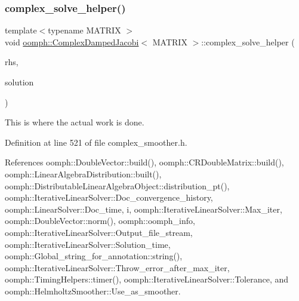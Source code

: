 \subsubsection{\texorpdfstring{complex\+\_\+solve\+\_\+helper()}{complex\_solve\_helper()}}
{\footnotesize\ttfamily template$<$typename M\+A\+T\+R\+IX $>$ \\
void \hyperlink{classoomph_1_1ComplexDampedJacobi}{oomph\+::\+Complex\+Damped\+Jacobi}$<$ M\+A\+T\+R\+IX $>$\+::complex\+\_\+solve\+\_\+helper (\begin{DoxyParamCaption}\item[{const \hyperlink{classoomph_1_1Vector}{Vector}$<$ \hyperlink{classoomph_1_1DoubleVector}{Double\+Vector} $>$ \&}]{rhs,  }\item[{\hyperlink{classoomph_1_1Vector}{Vector}$<$ \hyperlink{classoomph_1_1DoubleVector}{Double\+Vector} $>$ \&}]{solution }\end{DoxyParamCaption})\hspace{0.3cm}{\ttfamily [private]}}



This is where the actual work is done. 



Definition at line 521 of file complex\+\_\+smoother.\+h.



References oomph\+::\+Double\+Vector\+::build(), oomph\+::\+C\+R\+Double\+Matrix\+::build(), oomph\+::\+Linear\+Algebra\+Distribution\+::built(), oomph\+::\+Distributable\+Linear\+Algebra\+Object\+::distribution\+\_\+pt(), oomph\+::\+Iterative\+Linear\+Solver\+::\+Doc\+\_\+convergence\+\_\+history, oomph\+::\+Linear\+Solver\+::\+Doc\+\_\+time, i, oomph\+::\+Iterative\+Linear\+Solver\+::\+Max\+\_\+iter, oomph\+::\+Double\+Vector\+::norm(), oomph\+::oomph\+\_\+info, oomph\+::\+Iterative\+Linear\+Solver\+::\+Output\+\_\+file\+\_\+stream, oomph\+::\+Iterative\+Linear\+Solver\+::\+Solution\+\_\+time, oomph\+::\+Global\+\_\+string\+\_\+for\+\_\+annotation\+::string(), oomph\+::\+Iterative\+Linear\+Solver\+::\+Throw\+\_\+error\+\_\+after\+\_\+max\+\_\+iter, oomph\+::\+Timing\+Helpers\+::timer(), oomph\+::\+Iterative\+Linear\+Solver\+::\+Tolerance, and oomph\+::\+Helmholtz\+Smoother\+::\+Use\+\_\+as\+\_\+smoother.

\mbox{\label{classoomph_1_1ComplexDampedJacobi_a34e565b3536b286b5544f5e30935b9e9}} 
